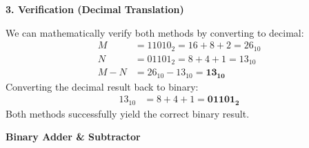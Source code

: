 \documentclass[12pt,a3paper]{article}
\newcommand{\subtopic}[2]{%
  \vspace{10pt}
  \noindent\begin{tcolorbox}[colback=#1!8,colframe=#1,boxrule=0.6pt,arc=4pt,
    left=6pt,right=6pt,top=4pt,bottom=4pt]
    \small\bfseries\textcolor{#1}{#2}
  \end{tcolorbox}
  \vspace{2pt}
}
\begin{document}
\begin{enumerate}
\begin{tcolorbox}[enhanced,breakable,ansbox,colback=cD!4,colframe=cD,boxrule=0.8pt,arc=5pt,title={\textbf{Answer}},fonttitle=\bfseries\color{white},colbacktitle=cD]
\vspace{1em}
\textbf{\textcolor{cD}{3. Verification (Decimal Translation)}}

We can mathematically verify both methods by converting to decimal:
\begin{align*}
    M &= 11010_2 = 16 + 8 + 2 = 26_{10} \\
    N &= 01101_2 = 8 + 4 + 1 = 13_{10} \\
    M - N &= 26_{10} - 13_{10} = \mathbf{13_{10}}
\end{align*}
Converting the decimal result back to binary:
\begin{align*}
    13_{10} &= 8 + 4 + 1 = \mathbf{01101_2}
\end{align*}
Both methods successfully yield the correct binary result.

\end{tcolorbox}

\end{enumerate}

\subtopic{cD}{Binary Adder \& Subtractor}
\label{sub:s4-adder-sub}
\end{document}
